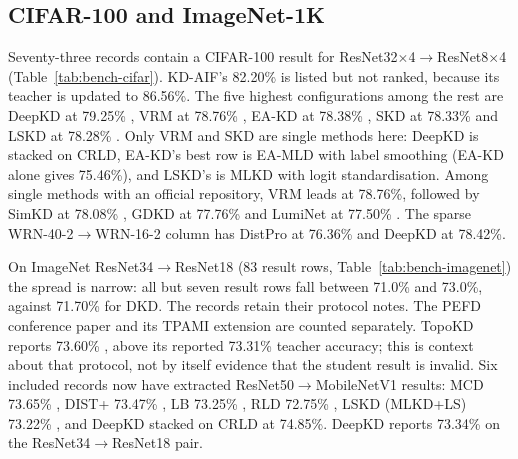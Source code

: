 \subsection{CIFAR-100 and ImageNet-1K}
\label{sec:bench-cifar}
\label{sec:bench-imagenet}

Seventy-three records contain a CIFAR-100 result for ResNet32$\times$4$\to$ResNet8$\times$4 (Table~\ref{tab:bench-cifar}).
KD-AIF's 82.20\% is listed but not ranked, because its teacher is updated to 86.56\%. The five highest
configurations among the rest are DeepKD at 79.25\% \citep{huang2025deepkd}, VRM at 78.76\%
\citep{zhang2025vrm}, EA-KD at 78.38\% \citep{su2025eakd}, SKD at 78.33\% \citep{jeong2026skd} and LSKD at
78.28\% \citep{sun2024lskd}. Only VRM and SKD are single methods here: DeepKD is stacked on CRLD, EA-KD's best
row is EA-MLD with label smoothing (EA-KD alone gives 75.46\%), and LSKD's is MLKD with logit
standardisation. Among single methods with an official repository, VRM leads at 78.76\%, followed by SimKD at 78.08\%
\citep{chen2022simkd}, GDKD at 77.76\% \citep{zheng2025gdkd} and LumiNet at 77.50\% \citep{hossain2025luminet}.
The sparse WRN-40-2$\to$WRN-16-2 column has DistPro at 76.36\% \citep{deng2022distpro} and DeepKD at 78.42\%.

On ImageNet ResNet34$\to$ResNet18 (83 result rows, Table~\ref{tab:bench-imagenet}) the spread is narrow: all but
seven result rows fall between 71.0\% and 73.0\%, against 71.70\% for DKD. The records retain their protocol notes. The PEFD conference paper and its TPAMI extension are counted separately. TopoKD
reports 73.60\% \citep{kim2024topkd}, above its reported 73.31\% teacher accuracy; this is context about that protocol, not by itself evidence that the student result is invalid. Six included records now have extracted ResNet50$\to$MobileNetV1 results: MCD 73.65\% \citep{mishra2026mcd}, DIST+ 73.47\% \citep{huang2025distplus}, LB 73.25\% \citep{lin2026lb}, RLD 72.75\% \citep{sun2025rld}, LSKD (MLKD+LS) 73.22\% \citep{sun2024lskd}, and DeepKD stacked on CRLD at 74.85\%. DeepKD reports 73.34\% on the ResNet34$\to$ResNet18 pair.

